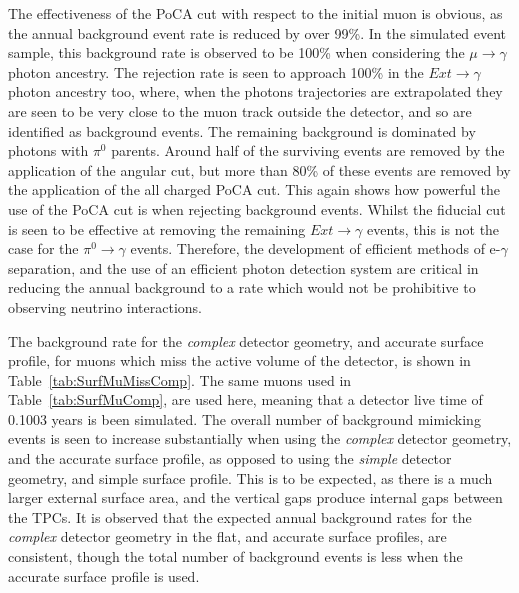 The effectiveness of the PoCA cut with respect to the initial muon is obvious, as the annual background event rate is reduced by over 99\%. In the simulated event sample, this background rate is observed to be 100\% when considering the $\mu\to\gamma$ photon ancestry. The rejection rate is seen to approach 100\% in the $Ext\to\gamma$ photon ancestry too, where, when the photons trajectories are extrapolated they are seen to be very close to the muon track outside the detector, and so are identified as background events. The remaining background is dominated by photons with $\pi^{0}$ parents. Around half of the surviving events are removed by the application of the angular cut, but more than 80\% of these events are removed by the application of the all charged PoCA cut. This again shows how powerful the use of the PoCA cut is when rejecting background events. Whilst the fiducial cut is seen to be effective at removing the remaining $Ext\to\gamma$ events, this is not the case for the $\pi^0\to\gamma$ events. Therefore, the development of efficient methods of e-$\gamma$ separation, and the use of an efficient photon detection system are critical in reducing the annual background to a rate which would not be prohibitive to observing neutrino interactions. 

The background rate for the \emph{complex} detector geometry, and accurate surface profile, for muons which miss the active volume of the detector, is shown in Table~\ref{tab:SurfMuMissComp}. The same muons used in Table~\ref{tab:SurfMuComp}, are used here, meaning that a detector live time of 0.1003 years is been simulated. The overall number of background mimicking events is seen to increase substantially  when using the \emph{complex} detector geometry, and the accurate surface profile, as opposed to using the \emph{simple} detector geometry, and simple surface profile. This is to be expected, as there is a much larger external surface area, and the vertical gaps produce internal gaps between the TPCs. It is observed that the expected annual background rates for the \emph{complex} detector geometry in the flat, and accurate surface profiles, are consistent, though the total number of background events is less when the accurate surface profile is used. \\

